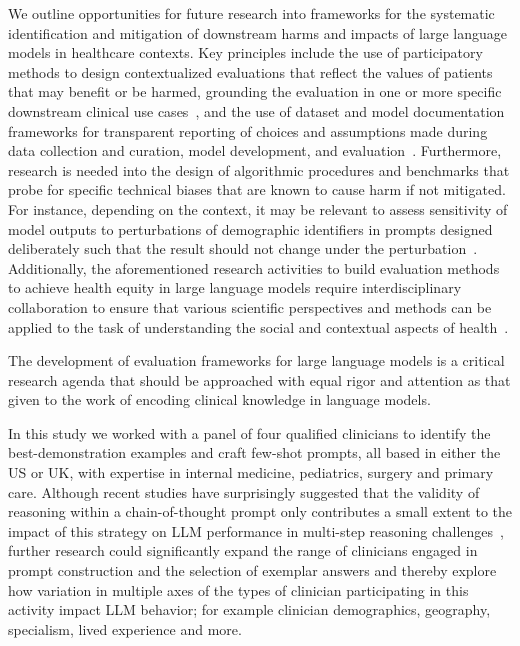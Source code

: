 We outline opportunities for future research into frameworks for the systematic identification and mitigation of downstream harms and impacts of large language models in healthcare contexts. Key principles include the use of participatory methods to design contextualized evaluations that reflect the values of patients that may benefit or be harmed, grounding the evaluation in one or more specific downstream clinical use cases~\cite{liu2022medical, raji2020closing}, and the use of dataset and model documentation frameworks for transparent reporting of choices and assumptions made during data collection and curation, model development, and evaluation~\cite{rostamzadeh2022healthsheet, gebru2021datasheets, mitchell2019model}. Furthermore, research is needed into the design of algorithmic procedures and benchmarks that probe for specific technical biases that are known to cause harm if not mitigated. For instance, depending on the context, it may be relevant to assess sensitivity of model outputs to perturbations of demographic identifiers in prompts designed deliberately such that the result should not change under the perturbation~\cite{garg2019counterfactual, prabhakaran2019perturbation, zhang2020hurtful}. Additionally, the aforementioned research activities to build evaluation methods to achieve health equity in large language models require interdisciplinary collaboration to ensure that various scientific perspectives and methods can be applied to the task of understanding the social and contextual aspects of health~\cite{matheny2022artificial, white2022blueprint, guidance2021ethics}. 

The development of evaluation frameworks for large language models is a critical research agenda that should be approached with equal rigor and attention as that given to the work of encoding clinical knowledge in  language models. 

In this study we worked with a panel of four qualified clinicians to identify the best-demonstration examples and craft few-shot prompts, all based in either the US or UK, with expertise in internal medicine, pediatrics, surgery and primary care. Although recent studies have surprisingly suggested that the validity of reasoning within a chain-of-thought prompt only contributes a small extent to the impact of this strategy on LLM performance in multi-step reasoning challenges~\cite{wang2022towards}, further research could significantly expand the range of clinicians engaged in prompt construction and the selection of exemplar answers and thereby explore how variation in multiple axes of the types of clinician participating in this activity impact LLM behavior; for example clinician demographics, geography, specialism, lived experience and more.

